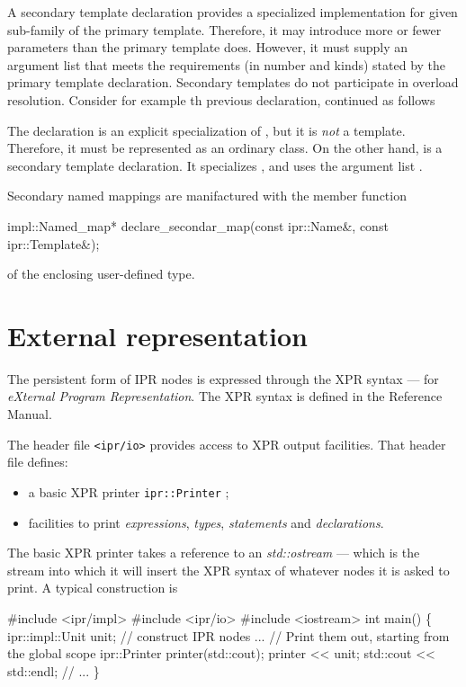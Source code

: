 \documentclass[a4paper,12pt]{article}
\begin{document}
A secondary template declaration provides a specialized implementation for 
given sub-family of the primary template.  Therefore, it may introduce
more or fewer parameters than the primary template does.  However, it must
supply an argument list that meets the requirements (in number and kinds)
stated by the primary template declaration. Secondary templates do not
participate in overload resolution. Consider for example th previous
 declaration, continued as follows
The declaration  is an explicit specialization of
, but it is \emph{not} a template.  Therefore, it must be
represented as an ordinary class.  On the other hand,  is a
secondary template declaration.  It specializes , and uses the 
argument list .

Secondary named mappings are manifactured with the member function
\begin{Program}
  impl::Named_map* declare_secondar_map(const ipr::Name&, const ipr::Template&);
\end{Program}
of the enclosing user-defined type.

\section{External representation}
\label{sec:xpr}

The persistent form of IPR nodes is expressed through the 
XPR syntax --- for \emph{eXternal Program Representation}.  The XPR syntax is
defined in the Reference Manual.  

The header file \texttt{<ipr/io>} provides access to XPR output 
facilities.  That header file defines:
\begin{itemize}
\item a basic XPR printer \texttt{ipr::Printer} ;
\item facilities to print \emph{expressions}, \emph{types}, \emph{statements}
  and \emph{declarations}.  
\end{itemize}

The basic XPR printer takes a reference to an \emph{std::ostream} --- which is
the stream into which it will insert the XPR syntax of whatever nodes it is
asked to print.  A typical construction is 
\begin{Program}
  \#include <ipr/impl>
  \#include <ipr/io>
  \#include <iostream>
  int main() 
  \{
      ipr::impl::Unit unit;
      // construct IPR nodes ...
      // Print them out, starting from the global scope
      ipr::Printer printer(std::cout);
      printer << unit;
      std::cout << std::endl;
      // ...
  \}
\end{Program}



\end{document}
